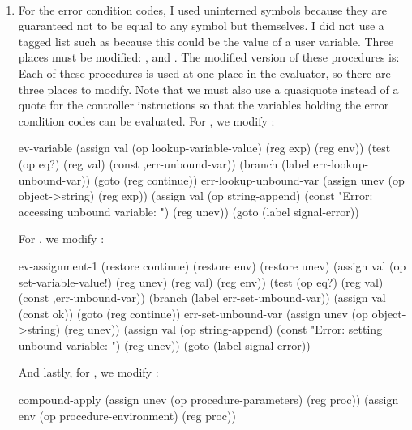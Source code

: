 \begin{exe}[5.30]
    \label{5.30}
    \ \vspace{-20pt}
    \begin{enumerate}
	\item For the error condition codes, I used uninterned symbols because 
	    they are guaranteed not to be equal to any symbol but themselves. 
	    I did not use a tagged list such as  because 
	    this could be the value of a user variable. Three places must be 
	    modified: ,  
	    and . The modified version of these 
	    procedures is:
	    Each of these procedures is used at one place in the evaluator, so 
	    there are three places to modify. Note that we must also use 
	    a quasiquote instead of a quote for the controller instructions so 
	    that the variables holding the error condition codes can be 
	    evaluated.
	    For , we modify :
	    \begin{cscm}
		ev-variable
		    (assign val
			    (op lookup-variable-value)
			    (reg exp)
			    (reg env))
		    (test (op eq?) (reg val) (const ,err-unbound-var))
		    (branch (label err-lookup-unbound-var))
		    (goto (reg continue))
		err-lookup-unbound-var
		    (assign unev (op object->string) (reg exp))
		    (assign val (op string-append)
			    (const "Error: accessing unbound variable: ")
			    (reg unev))
		    (goto (label signal-error))
	    \end{cscm}
	    For , we modify :
	    \begin{cscm}
		ev-assignment-1
		    (restore continue)
		    (restore env)
		    (restore unev)
		    (assign val (op set-variable-value!) (reg unev) (reg val) (reg env))
		    (test (op eq?) (reg val) (const ,err-unbound-var))
		    (branch (label err-set-unbound-var))
		    (assign val (const ok))
		    (goto (reg continue))
		err-set-unbound-var
		    (assign unev (op object->string) (reg unev))
		    (assign val (op string-append)
			    (const "Error: setting unbound variable: ")
			    (reg unev))
		    (goto (label signal-error))
	    \end{cscm}
	    And lastly, for , we modify 
	    :
	    \begin{cscm}
		compound-apply
		    (assign unev (op procedure-parameters) (reg proc))
		    (assign env (op procedure-environment) (reg proc))

\end{cscm}
\end{enumerate}
\end{exe}
